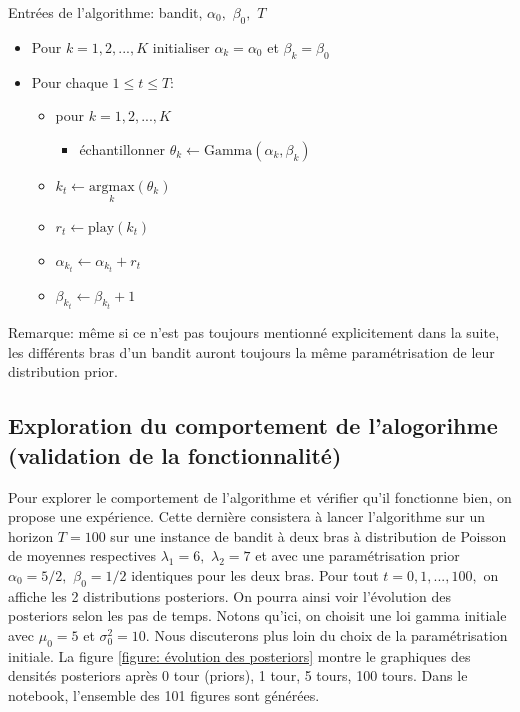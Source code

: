 \documentclass[letterpaper,11pt]{article}
\begin{document}
Entrées de l'algorithme: bandit, $\alpha_0,$ $\beta_0,$ $T$\\

\begin{itemize}
\setlength\itemsep{0.2cm}

\item
Pour $k=1,2,...,K$ initialiser $\alpha_k=\alpha_0$ et $\beta_k=\beta_0$

\item Pour chaque $1\leq t \leq T :$

\begin{itemize}
\item
pour $k=1,2,...,K$ 

\begin{itemize}
\item
échantillonner $\theta_k \leftarrow \mathrm{Gamma}(\alpha_k,\beta_k)$

\end{itemize}

\item
$k_t\leftarrow \underset{k}{\mathrm{argmax}} (\theta_{k})$ 

\item
$r_t\leftarrow \mathrm{play}(k_t)$ 

\item 
$\alpha_{k_t} \leftarrow \alpha_{k_t}+r_t$

\item
$\beta_{k_t} \leftarrow \beta_{k_t}+1$

\end{itemize}

\end{itemize}

\vspace*{0.2cm}
Remarque: même si ce n'est pas toujours mentionné explicitement dans la suite, les différents bras d'un bandit auront toujours la même paramétrisation de leur distribution prior.

\subsection{Exploration du comportement de l'alogorihme (validation de la fonctionnalité)}

Pour explorer le comportement de l'algorithme et vérifier qu'il fonctionne bien, on propose une expérience. Cette dernière consistera à lancer l'algorithme sur un horizon $T=100$ sur une instance de bandit à deux bras à distribution de Poisson de moyennes respectives $\lambda_1=6,$ $\lambda_2=7$ et avec une paramétrisation prior $\alpha_0=5/2,$ $\beta_0=1/2$ identiques pour les deux bras. Pour tout $t=0,1,...,100,$ on affiche les 2 distributions posteriors. On pourra ainsi voir l'évolution des posteriors selon les pas de temps. Notons qu'ici, on choisit une loi gamma initiale avec $\mu_0=5$ et $\sigma_0^2=10.$ Nous discuterons plus loin du choix de la paramétrisation initiale. La figure \ref{figure: évolution des posteriors} montre le graphiques des densités posteriors après 0 tour (priors), 1 tour, 5 tours, 100 tours. Dans le notebook, l'ensemble des 101 figures sont générées. \\
\end{document}
